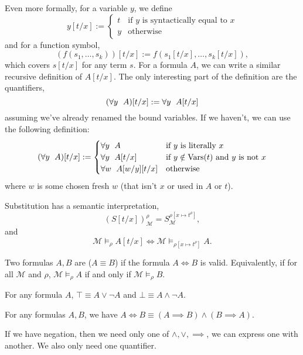 Even more formally, for a variable $y$, we define
\[
  y[t/x] :=
  \begin{cases}
	t & \text{if $y$ is syntactically equal to $x$} \\
	y & \text{otherwise}
  \end{cases}
\]
and for a function symbol,
\[
  (f(s_1, \ldots, s_k))[t/x] := f(s_1[t/x], \ldots, s_k[t/x]),
\]
which covers $s[t/x]$ for any term $s$.
For a formula $A$, we can write a similar recursive definition of $A[t/x]$.
The only interesting part of the definition are the quantifiers,
\[
  (\forall y \;\  A)[t/x] := \forall y \;\  A[t/x]
\]
assuming we've already renamed the bound variables.
If we haven't, we can use the following definition:
\[
  (\forall y \;\  A)[t/x]
  :=
  \begin{cases}
	\forall y \;\  A & \text{if $y$ is literally $x$} \\
	\forall y \;\  A[t/x] & \text{if $y \notin \operatorname{Vars}(t)$ and $y$ is not $x$} \\
	\forall w \;\  A[w/y][t/x] & \text{otherwise}
  \end{cases}
\]
where $w$ is some chosen fresh $w$ (that isn't $x$ or used in $A$ or $t$).

Substitution has a semantic interpretation,
\[
  \left( S[t/x] \right)^\rho_{\mathcal{M}}
  = S^{\rho[x \mapsto t^\rho]}_{\mathcal{M}},
\]
and
\[
  \mathcal{M} \models_\rho A[t/x]
  \iff \mathcal{M} \models_{\rho[x \mapsto t^\rho]} A.
\]

\begin{definition}
  Two formulas $A, B$ are  ($A \equiv B$) if the
  formula $A \iff B$ is valid.
  Equivalently, if for all $\mathcal{M}$ and $\rho$, $\mathcal{M} \models_\rho
  A$ if and only if $\mathcal{M} \models_\rho B$.
\end{definition}

\begin{example}
  For any formula $A$, $\top \equiv A \lor \lnot A$ and $\bot \equiv A \land
  \lnot A$.
\end{example}

\begin{example}
  For any formulas $A, B$, we have $A \iff B \equiv (A \implies B) \land (B
  \implies A)$.
\end{example}

\begin{example}
  If we have negation, then we need only one of $\land, \lor, \implies$, we can
  express one with another.
  We also only need one quantifier.
\end{example}

